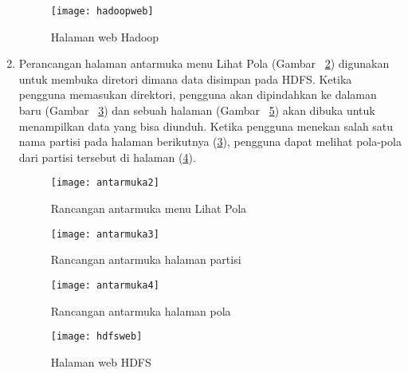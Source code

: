\begin{enumerate}
\begin{itemize}
\end{itemize} 


\begin{figure}[H]
    \centering  
    \texttt{[image: hadoopweb]}  
    \caption[Halaman web Hadoop]{Halaman web Hadoop} 
    \label{fig:hadoopweb} 
\end{figure}


\item Perancangan halaman antarmuka menu Lihat Pola (Gambar ~\ref{fig:antarmuka2}) digunakan untuk membuka diretori dimana data disimpan pada HDFS. Ketika pengguna memasukan direktori, pengguna akan dipindahkan ke dalaman baru (Gambar ~\ref{fig:antarmuka3}) dan sebuah halaman (Gambar ~\ref{fig:hdfsweb}) akan dibuka untuk menampilkan data yang bisa diunduh. Ketika pengguna menekan salah satu nama partisi pada halaman berikutnya (\ref{fig:antarmuka3}), pengguna dapat melihat pola-pola dari partisi tersebut di halaman (\ref{fig:antarmuka4}).  

\begin{figure}[H]
    \centering  
    \texttt{[image: antarmuka2]}  
    \caption[Rancangan antarmuka menu Lihat Pola]{Rancangan antarmuka menu Lihat Pola} 
    \label{fig:antarmuka2} 
\end{figure}

\begin{figure}[H]
    \centering  
    \texttt{[image: antarmuka3]}  
    \caption[Rancangan antarmuka halaman partisi]{Rancangan antarmuka halaman partisi} 
    \label{fig:antarmuka3} 
\end{figure}

\begin{figure}[H]
    \centering  
    \texttt{[image: antarmuka4]}  
    \caption[Rancangan antarmuka halaman pola]{Rancangan antarmuka halaman pola} 
    \label{fig:antarmuka4} 
\end{figure}

\begin{figure}[H]
    \centering  
    \texttt{[image: hdfsweb]}  
    \caption[Halaman web HDFS]{Halaman web HDFS} 
    \label{fig:hdfsweb} 
\end{figure}


\end{enumerate}



